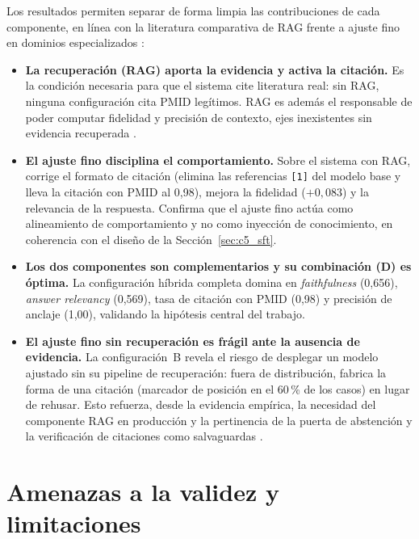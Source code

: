 \documentclass[11pt,a4paper,spanish]{book}
\numberwithin{equation}{chapter}
\numberwithin{figure}{chapter}
\begin{document}
Los resultados permiten separar de forma limpia las contribuciones de cada componente, en línea con la literatura comparativa de RAG frente a ajuste fino en dominios especializados \cite{balaguer2024ragvsfinetuningpipelines, ovadia2024finetuningretrievalcomparingknowledge, pingua_medical_FT_vs_RAG_2025}:

\begin{itemize}
  \item \textbf{La recuperación (RAG) aporta la evidencia y activa la citación.} Es la condición necesaria para que el sistema cite literatura real: sin RAG, ninguna configuración cita PMID legítimos. RAG es además el responsable de poder computar fidelidad y precisión de contexto, ejes inexistentes sin evidencia recuperada \cite{lewis_retrieval-augmented_2021}.
  \item \textbf{El ajuste fino disciplina el comportamiento.} Sobre el sistema con RAG, corrige el formato de citación (elimina las referencias \texttt{[1]} del modelo base y lleva la citación con PMID al 0{,}98), mejora la fidelidad ($+0{,}083$) y la relevancia de la respuesta. Confirma que el ajuste fino actúa como alineamiento de comportamiento y no como inyección de conocimiento, en coherencia con el diseño de la Sección~\ref{sec:c5_sft}.
  \item \textbf{Los dos componentes son complementarios y su combinación (D) es óptima.} La configuración híbrida completa domina en \textit{faithfulness} (0{,}656), \textit{answer relevancy} (0{,}569), tasa de citación con PMID (0{,}98) y precisión de anclaje (1{,}00), validando la hipótesis central del trabajo.
  \item \textbf{El ajuste fino sin recuperación es frágil ante la ausencia de evidencia.} La configuración~B revela el riesgo de desplegar un modelo ajustado sin su pipeline de recuperación: fuera de distribución, fabrica la forma de una citación (marcador de posición en el 60\,\% de los casos) en lugar de rehusar. Esto refuerza, desde la evidencia empírica, la necesidad del componente RAG en producción y la pertinencia de la puerta de abstención y la verificación de citaciones como salvaguardas \cite{ji_survey_2023, pal_med-halt_2023}.
\end{itemize}

\section{Amenazas a la validez y limitaciones}
\label{sec:c6_limitaciones}
\end{document}
